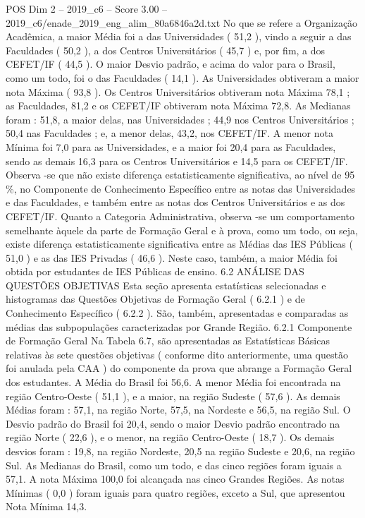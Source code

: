 \begin{textsample}{POS Dim 2 – 2019\_c6 – Score 3.00 – 2019\_c6/enade\_2019\_eng\_alim\_80a6846a2d.txt}
No que se refere a Organização Acadêmica, a maior Média foi a das Universidades ( 51,2 ), vindo a seguir a das Faculdades ( 50,2 ), a dos Centros Universitários ( 45,7 ) e, por fim, a dos CEFET/IF ( 44,5 ).
O maior Desvio padrão, e acima do valor para o Brasil, como um todo, foi o das Faculdades ( 14,1 ).
As Universidades obtiveram a maior nota Máxima ( 93,8 ).
Os Centros Universitários obtiveram nota Máxima 78,1 ; as Faculdades, 81,2 e os CEFET/IF obtiveram nota Máxima 72,8.
As Medianas foram : 51,8, a maior delas, nas Universidades ; 44,9 nos Centros Universitários ; 50,4 nas Faculdades ; e, a menor delas, 43,2, nos CEFET/IF.
A menor nota Mínima foi 7,0 para as Universidades, e a maior foi 20,4 para as Faculdades, sendo as demais 16,3 para os Centros Universitários e 14,5 para os CEFET/IF.
Observa -se que não existe diferença estatisticamente significativa, ao nível de 95 \%, no Componente de Conhecimento Específico entre as notas das Universidades e das Faculdades, e também entre as notas dos Centros Universitários e as dos CEFET/IF.
Quanto a Categoria Administrativa, observa -se um comportamento semelhante àquele da parte de Formação Geral e à prova, como um todo, ou seja, existe diferença estatisticamente significativa entre as Médias das IES Públicas ( 51,0 ) e as das IES Privadas ( 46,6 ).
Neste caso, também, a maior Média foi obtida por estudantes de IES Públicas de ensino. 6.2 ANÁLISE DAS QUESTÕES OBJETIVAS Esta seção apresenta estatísticas selecionadas e histogramas das Questões Objetivas de Formação Geral ( 6.2.1 ) e de Conhecimento Específico ( 6.2.2 ).
São, também, apresentadas e comparadas as médias das subpopulações caracterizadas por Grande Região. 6.2.1 Componente de Formação Geral Na Tabela 6.7, são apresentadas as Estatísticas Básicas relativas às sete questões objetivas ( conforme dito anteriormente, uma questão foi anulada pela CAA ) do componente da prova que abrange a Formação Geral dos estudantes.
A Média do Brasil foi 56,6.
A menor Média foi encontrada na região Centro-Oeste ( 51,1 ), e a maior, na região Sudeste ( 57,6 ).
As demais Médias foram : 57,1, na região Norte, 57,5, na Nordeste e 56,5, na região Sul.
O Desvio padrão do Brasil foi 20,4, sendo o maior Desvio padrão encontrado na região Norte ( 22,6 ), e o menor, na região Centro-Oeste ( 18,7 ).
Os demais desvios foram : 19,8, na região Nordeste, 20,5 na região Sudeste e 20,6, na região Sul.
As Medianas do Brasil, como um todo, e das cinco regiões foram iguais a 57,1.
A nota Máxima 100,0 foi alcançada nas cinco Grandes Regiões.
As notas Mínimas ( 0,0 ) foram iguais para quatro regiões, exceto a Sul, que apresentou Nota Mínima 14,3.

\end{textsample}
